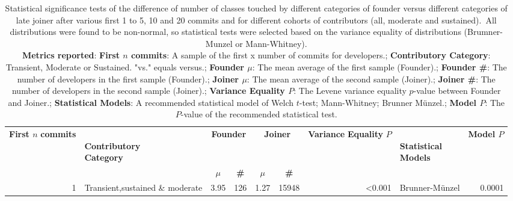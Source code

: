 \begin{table}[H]
\centering
\setlength{\tabcolsep}{2pt}
\caption[Statistical Significance Normality and Variance tests for classes for different categories of founder versus different categories of late joiner  for 1 to 5, 10 and 20]{Statistical significance tests of the difference of number of classes touched by different categories of founder versus different categories of late joiner  after various first 1 to 5, 10 and 20 commits and for different cohorts of contributors (all, moderate and sustained). All distributions were found to be non-normal, so statistical tests were selected based on the variance equality of distributions (Brumner-Munzel or Mann-Whitney). \\ \textbf{Metrics reported}:   \textbf{First $n$ commits}: A sample of the first x number of commits for developers.;  \textbf{Contributory Category}: Transient, Moderate or Sustained. "vs." equals versus.;  \textbf{Founder $\mu$}: The mean average of the first sample (Founder).;  \textbf{Founder \#}: The number of developers in the first sample (Founder).;  \textbf{Joiner $\mu$}: The mean average of the second sample (Joiner).;  \textbf{Joiner \#}: The number of developers in the second sample (Joiner).;  \textbf{Variance Equality $P$}: The Levene variance equality $p$-value between Founder and Joiner.;  \textbf{Statistical Models}: A recommended statistical model of Welch $t$-test; Mann-Whitney; Brunner Münzel.;  \textbf{Model $P$}: The $P$-value of the recommended statistical test.
}
\begin{tabular}{r p{4cm} c c c c r l r}
\toprule
\makecell[t]{\textbf{First $n$}\\\textbf{commits}} & \makecell[t]{\textbf{}\\\textbf{Contributory}\\\textbf{Category}} & \multicolumn{2}{c}{\textbf{Founder}} & \multicolumn{2}{c}{\textbf{Joiner}} & \makecell[t]{\textbf{Variance}\\\textbf{Equality}\\\textbf{$P$}} & \makecell[t]{\textbf{}\\\textbf{Statistical}\\\textbf{Models}} & \textbf{Model $P$} \\ 
\cmidrule(lr){3-4} \cmidrule(lr){5-6}
 &  & \textbf{$\mu$} & \textbf{\#} & \textbf{$\mu$} & \textbf{\#} &  &  &  \\ 
\midrule
1 & Transient,sustained \& moderate &  3.95 & 126 & 1.27 & 15948 & \textless 0.001 &  Brunner-Münzel & 0.0001 \\ 

\end{tabular}
\end{table}
